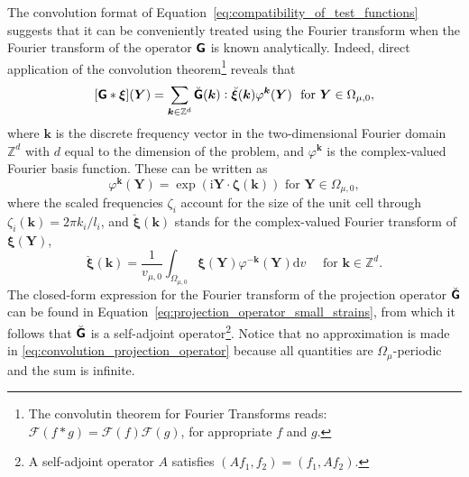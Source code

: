 The convolution format of Equation~\eqref{eq:compatibility_of_test_functions} suggests that it can be conveniently treated using the Fourier transform when the Fourier transform of the operator \(\boldsymbol{\mathsf{G}}\) is known analytically.
Indeed, direct application of the convolution theorem\footnote{The convolutin theorem for Fourier Transforms reads: \(\mathcal F(f*g) = \mathcal F(f)\mathcal F(g)\), for appropriate \(f\) and \(g\).} reveals that
\begin{equation}\label{eq:convolution_projection_operator}
[\boldsymbol{\mathsf{G}} * \bm{\xi}](\bm{Y})=\sum_{\bm{k} \in \mathbb{Z}^{d}} \breve{\boldsymbol{\mathsf{G}} }(\bm{k}): \breve{\bm{\xi}}(\bm{k}) \varphi^{\bm{k} }(\bm{Y})\ \text { for } \bm{Y} \in \Omega_{\mu,0},
\end{equation}
where \(\bm k\) is the discrete frequency vector in the two-dimensional Fourier domain \(\mathbb{Z}^{d}\) with \(d\) equal to the dimension of the problem, and \(\varphi^{\bm k}\) is the complex-valued Fourier basis function.
These can be written as
\begin{equation} \label{eq:fourier_basis_functions}
\varphi^{\bm k}(\bm{Y})=\exp \left( \mathrm{i}\bm Y\cdot \bm \zeta(\bm k)\right) \text { for } \bm{Y} \in \Omega_{\mu,0},
\end{equation}
where the scaled frequencies \(\zeta_i\) account for the size of the unit cell through \(\zeta_i(\bm k) = 2 \pi k_i/l_i\),
and \(\breve{\bm \xi}(\bm{k})\) stands for the complex-valued Fourier transform of \(\bm{\xi}(\bm{Y})\),
\begin{equation}
\breve{\bm\xi}(\bm{k})=\frac{1}{v_{\mu,0}} \int_{\Omega_{\mu,0}} \bm{\xi}(\bm{Y}) \varphi^{-\bm{k}}(\bm{Y}) \mathrm{d} v\quad \text { for } \bm{k} \in \mathbb{Z}^{d}.
\end{equation}
The closed-form expression for the Fourier transform of the projection operator \(\breve{\boldsymbol{\mathsf{G}}}\) can be found in Equation~\eqref{eq:projection_operator_small_strains}, from which it follows that \(\breve{\boldsymbol{\mathsf{G}}}\) is a self-adjoint operator\footnote{A self-adjoint operator \(A\) satisfies \((Af_1,f_2)=(f_1, Af_2)\).}.
Notice that no approximation is made in \eqref{eq:convolution_projection_operator} because all quantities are \(\Omega_{\mu}\)-periodic and the sum is infinite.

